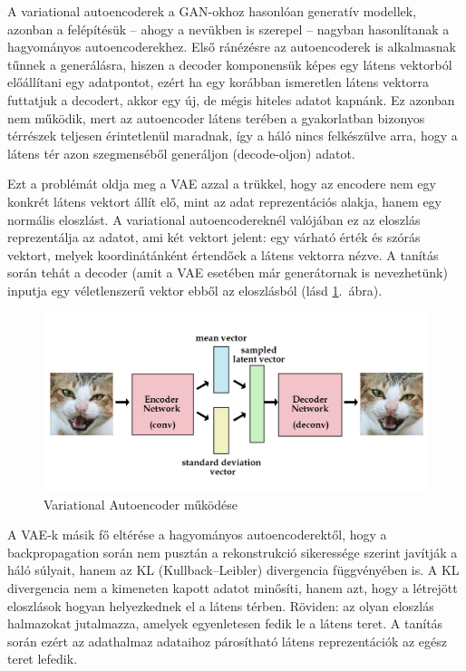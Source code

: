 A variational autoencoderek a GAN-okhoz hasonlóan generatív modellek, azonban a felépítésük -- ahogy a nevükben is szerepel --  nagyban hasonlítanak a hagyományos autoencoderekhez.
Első ránézésre az autoencoderek is alkalmasnak tűnnek a generálásra, hiszen a decoder komponensük képes egy látens vektorból előállítani egy adatpontot, ezért ha egy korábban ismeretlen látens vektorra futtatjuk a decodert, akkor egy új, de mégis hiteles adatot kapnánk. Ez azonban nem működik, mert az autoencoder látens terében a gyakorlatban bizonyos térrészek teljesen érintetlenül maradnak, így a háló nincs felkészülve arra, hogy a látens tér azon szegmenséből generáljon (decode-oljon) adatot.

Ezt a problémát oldja meg a VAE azzal a trükkel, hogy az encodere nem egy konkrét látens vektort állít elő, mint az adat reprezentációs alakja, hanem egy normális eloszlást. A variational autoencodereknél valójában ez az eloszlás reprezentálja az adatot, ami két vektort jelent: egy várható érték és szórás vektort, melyek koordinátánként értendőek a látens vektorra nézve. A tanítás során tehát a decoder (amit a VAE esetében már generátornak is nevezhetünk) inputja egy véletlenszerű vektor ebből az eloszlásból (lásd \ref{vae}.~ábra).

\begin{figure}[h!]
\begin{center}
  
  
	\begin{center}
	\includegraphics[width=\linewidth]{vae.jpg}
	\end{center}
	
  \caption{Variational Autoencoder működése}\label{vae}
\end{center}
\end{figure}

A VAE-k másik fő eltérése a hagyományos autoencoderektől, hogy a backpropagation során nem pusztán a rekonstrukció sikeressége szerint javítják a háló súlyait, hanem az KL (Kullback–Leibler) divergencia függvényében is. A KL divergencia nem a kimeneten kapott adatot minősíti, hanem azt, hogy a létrejött eloszlások hogyan helyezkednek el a látens térben. Röviden: az olyan eloszlás halmazokat jutalmazza, amelyek egyenletesen fedik le a látens teret. A tanítás során ezért az adathalmaz adataihoz párosítható látens reprezentációk az egész teret lefedik.

